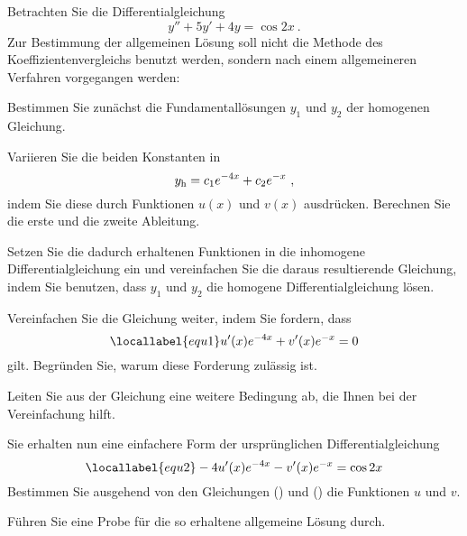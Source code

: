 \begin{atiTask}[
  title = Die Variation der Konstanten
]
  Betrachten Sie die Differentialgleichung
  \[
    y'' + 5y' + 4y = \cos 2x \ .
  \]
  Zur Bestimmung der allgemeinen Lösung soll nicht die Methode des Koeffizientenvergleichs benutzt werden, sondern nach einem allgemeineren Verfahren vorgegangen werden:
  \begin{atiSubtasks}
    \item{
      Bestimmen Sie zunächst die Fundamentallösungen $y_1$ und $y_2$ der homogenen Gleichung.
    }
    \item{
      Variieren Sie die beiden Konstanten in
      \[
        y_{\mathrm{h}} = c_1e^{-4x} + c_2e^{-x} \ ,
      \]
      indem Sie diese durch Funktionen $u(x)$ und $v(x)$ ausdrücken.
      Berechnen Sie die erste und die zweite Ableitung.
    }
    \item{
      Setzen Sie die dadurch erhaltenen Funktionen in die inhomogene Differentialgleichung ein und vereinfachen Sie die daraus resultierende Gleichung, indem Sie benutzen, dass $y_1$ und $y_2$ die homogene Differentialgleichung lösen.
    }
    \item{
      Vereinfachen Sie die Gleichung weiter, indem Sie fordern, dass
      \begin{equation}
        \locallabel{equ1}
        u'(x)e^{-4x} + v'(x)e^{-x} = 0
      \end{equation}
      gilt.
      Begründen Sie, warum diese Forderung zulässig ist.
    }
    \item{
      Leiten Sie aus der Gleichung  eine weitere Bedingung ab, die Ihnen bei der Vereinfachung hilft.
    }
    \item{
      Sie erhalten nun eine einfachere Form der ursprünglichen Differentialgleichung
      \begin{equation}
        \locallabel{equ2}
        -4u'(x)e^{-4x} - v'(x)e^{-x} = \cos 2x
      \end{equation}
      Bestimmen Sie ausgehend von den Gleichungen () und () die Funktionen $u$ und $v$.
    }
    \item{
      Führen Sie eine Probe für die so erhaltene allgemeine Lösung durch.
    }
  \end{atiSubtasks}
\end{atiTask}